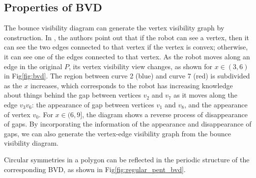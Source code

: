 \documentclass[]{styles/svproc}  %
\begin{document}
\subsection{Properties of BVD}
The bounce visibility diagram can generate the vertex visibility graph by
construction. In \cite{rourke_viz}, the authors point out that if the robot can
see a vertex, then it can see the two edges connected to that vertex if the
vertex is convex; otherwise, it can see one of the edges connected to that
vertex. As the robot moves along an edge in the original $P$, its vertex
visibility view changes, as shown for $x\in (3, 6)$ in Fig\~\ref{fig:bvd}. The
region between curve 2 (blue) and curve 7 (red) is subdivided as the $x$
increases, which corresponds to the robot has increasing knowledge about things
behind the gap between vertices $v_2$ and $v_7$ as it moves along the edge
$v_3v_6$: the appearance of gap between vertices $v_1$ and $v_8$, and the
appearance of vertex $v_0$. For $x\in (6, 9]$, the diagram shows a reverse
process of disappearance of gaps. By incorporating the information of the
appearance and disappearance of gaps, we can also generate the vertex-edge
visibility graph from the bounce visibility diagram.

Circular symmetries in a polygon can be reflected in the periodic structure of
the corresponding BVD, as shown in Fig\~\ref{fig:regular_pent_bvd}.
\end{document}
